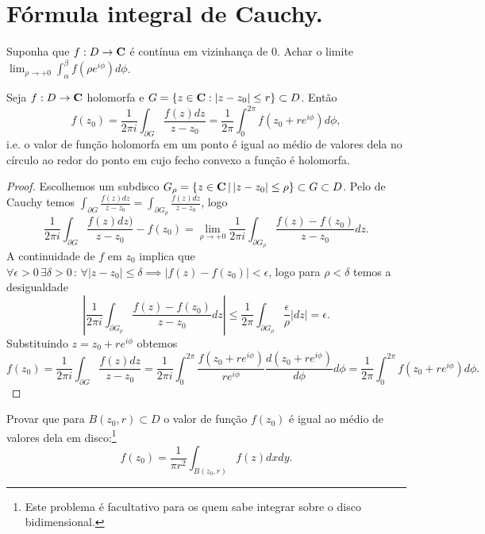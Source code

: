 \section{Fórmula integral de Cauchy.}

\begin{problema} Suponha que $f : D \to \mathbf{C}$ é contínua em vizinhança de $0$.
Achar o limite $\lim_{\rho \to +0} \int_\alpha^\beta f(\rho e^{i\phi}) d\phi$.
\end{problema}

\begin{teorema}
\label{t:medio}
Seja $f : D \to \mathbf{C}$ holomorfa
e $G = \{ z\in\mathbf{C} : |z-z_0| \leq r \} \subset D$. Então
\begin{equation}
f(z_0) = \frac1{2\pi i} \int_{\partial G} \frac{f(z)dz}{z-z_0} 
= \frac1{2\pi} \int_0^{2\pi} f(z_0 + r e^{i\phi}) d\phi,
\end{equation}
i.e. o valor de função holomorfa em um ponto é igual ao médio de valores dela
no círculo ao redor do ponto em cujo fecho convexo a função é holomorfa.
\end{teorema}
\begin{proof}
Escolhemos um subdisco $G_\rho = \{ z\in\mathbf{C} \,|\, |z-z_0| \leq \rho \} \subset G \subset D$.
Pelo  de Cauchy temos
$\int_{\partial G} \frac{f(z) dz}{z-z_0} = \int_{\partial G_\rho} \frac{f(z) dz}{z-z_0}$,
logo
\begin{equation*}
\frac1{2\pi i} \int_{\partial G} \frac{f(z)dz)}{z-z_0} - f(z_0) = 
\lim_{\rho\to +0}   \frac1{2\pi i} \int_{\partial G_\rho} \frac{f(z)-f(z_0)}{z-z_0} dz. 
\end{equation*}
A continuidade de $f$ em $z_0$ implica que
$\forall \epsilon > 0 \, \exists\delta >0 \,:\, \forall |z-z_0|\leq\delta \implies |f(z)-f(z_0)| < \epsilon$,
logo para $\rho<\delta$ temos a desigualdade
\[ |\frac1{2\pi i} \int_{\partial G_\rho} \frac{f(z)-f(z_0)}{z-z_0} dz| 
\leq \frac1{2\pi} \int_{\partial G_\rho} \frac{\epsilon}{\rho} |dz| = \epsilon. \]
Substituindo $z = z_0 + r e^{i\phi}$ obtemos
\[ f(z_0) = \frac{1}{2\pi i} \int_{\partial G} \frac{f(z)dz}{z-z_0} = 
\frac{1}{2\pi i} \int_0^{2\pi} \frac{f(z_0 + r e^{i\phi})}{r e^{i\phi}} \frac{d(z_0+re^{i\phi})}{d\phi} d\phi
= \frac1{2\pi} \int_0^{2\pi} f(z_0 + r e^{i\phi}) d\phi. \]
\end{proof}

\begin{problema}
Provar que para $B(z_0,r)\subset D$ o valor de função $f(z_0)$ é igual ao médio de valores dela
em disco:\footnote{Este problema é facultativo para os quem sabe integrar sobre o disco bidimensional.}
\begin{equation}
f(z_0) = \frac{1}{\pi r^2} \int_{B(z_0,r)} f(z) dx dy.
\end{equation}
\end{problema}

